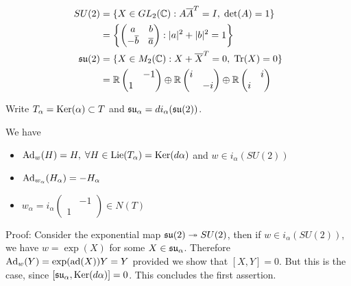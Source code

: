 \begin{remark}
    \begin{equation}
        \begin{aligned}
            SU(2)&=\{X\in GL_2(\mathbb{C}): A\overline{A}^T=I,\;\det(A)=1\}\\
                 &=\left\{\begin{pmatrix}a&b\\-\overline{b}&\overline{a}\end{pmatrix}: |a|^2+|b|^2=1\right\}\\
       \mathfrak{su}(2)&=\{X\in M_2(\mathbb{C}):X+\overline{X}^T=0,\;\text{Tr}(X)=0\}\\
                 &=\mathbb{R}\begin{pmatrix}
                 &-1\\1& 
            \end{pmatrix}\oplus
            \mathbb{R}\begin{pmatrix}
               i&\\&-i 
            \end{pmatrix}\oplus 
            \mathbb{R}\begin{pmatrix}
               &i\\i& 
            \end{pmatrix}
        \end{aligned}
    \end{equation}
\end{remark}

\begin{dang}
    \begin{notation}
        Write $T_\alpha = \text{Ker}(\alpha)\subset T$ and $\mathfrak{su}_\alpha = di_\alpha(\mathfrak{su}(2))$.
    \end{notation}
\end{dang}

\begin{dang}
    \begin{lemma}
        We have
        \begin{itemize}
            \item[1.] $\text{Ad}_w(H)=H,\;\forall H\in\text{Lie}(T_\alpha)=\text{Ker}(d\alpha)$ and $w\in i_\alpha(SU(2))$
            \item[2.] $\text{Ad}_{w_\alpha}(H_\alpha)=-H_\alpha$
            \item[3.] $w_\alpha=i_\alpha(\begin{smallmatrix}&-1\\1&\end{smallmatrix})\in N(T)$
        \end{itemize}
    \end{lemma}
\end{dang}
Proof: Consider the exponential map $\mathfrak{su}(2)\twoheadrightarrow SU(2)$, then if $w\in i_\alpha(SU(2))$, we have
$w=\exp(X)$ for some $X\in \mathfrak{su}_\alpha$. Therefore $\text{Ad}_w(Y)=\exp(\text{ad}(X))Y=Y$ provided we show that $[X,Y]=0$. 
But this is the case, since $[\mathfrak{su}_\alpha,\text{Ker}(d\alpha)]=0$. This concludes the first assertion.\par 

